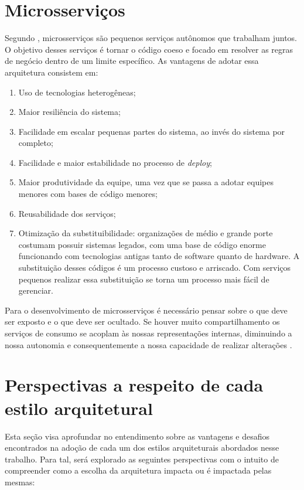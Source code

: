 \section{Microsserviços}

Segundo , microsserviços são pequenos serviços autônomos que
trabalham juntos. O objetivo desses serviços é tornar o código coeso e focado em
resolver as regras de negócio dentro de um limite específico. As vantagens de adotar
essa arquitetura consistem em:

\begin{enumerate}
    \item{Uso de tecnologias heterogêneas;}
    \item{Maior resiliência do sistema;}
    \item{Facilidade em escalar pequenas partes do sistema, ao invés do sistema por
    completo;}
    \item{Facilidade e maior estabilidade no processo de \textit{deploy};}
    \item{Maior produtividade da equipe, uma vez que se passa a adotar equipes
    menores com bases de código menores;}
    \item{Reusabilidade dos serviços;}
    \item{Otimização da substituibilidade: organizações de médio e grande porte costumam
    possuir sistemas legados, com uma base de código enorme funcionando com tecnologias
    antigas tanto de software quanto de hardware. A substituição desses códigos é um
    processo custoso e arriscado. Com serviços pequenos realizar essa substituição
    se torna um processo mais fácil de gerenciar.}
\end{enumerate}

Para o desenvolvimento de microsserviços é necessário pensar sobre o que deve ser
exposto e o que deve ser ocultado. Se houver muito compartilhamento os serviços de
consumo se acoplam às nossas representações internas, diminuindo a nossa autonomia
e consequentemente a nossa capacidade de realizar alterações \cite{Newman2015}.

\section{Perspectivas a respeito de cada estilo arquitetural}

Esta seção visa aprofundar no entendimento sobre as vantagens e desafios encontrados na adoção
de cada um dos estilos arquiteturais abordados nesse trabalho. Para tal, será explorado as seguintes
perspectivas com o intuito de compreender como a escolha da arquitetura impacta ou é impactada pelas
mesmas:

